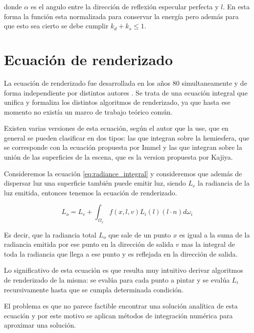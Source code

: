 donde $\alpha$ es el angulo entre la dirección de reflexión especular perfecta y $l$.
En esta forma la función esta normalizada para conservar la energía pero además para que esto sea cierto se debe cumplir $k_d + k_s \leq 1$.



\clearpage

\section{Ecuación de renderizado}

La ecuación de renderizado fue desarrollada en los años 80 simultaneamente y de forma independiente por distintos autores \cite{Kajiya1986, Immel1986}. Se trata de una ecuación integral que unifica y formaliza los distintos algoritmos de renderizado, ya que hasta ese momento no existía un marco de trabajo teórico común.

\medskip
Existen varias versiones de esta ecuación, según el autor que la use, que en general se pueden clasificar en dos tipos: las que integran sobre la hemiesfera, que se corresponde con la ecuación propuesta por Immel y las que integran sobre la unión de las superficies de la escena, que es la version propuesta por Kajiya.
\medskip

Consideremos la ecuación \ref{eq:radiance_integral}  y consideremos que además de dispersar luz una superficie también puede emitir luz, siendo $L_e$ la radiancia de la luz emitida, entonces tenemos la ecuación de renderizado.

\begin{equation}
L _ o = L_e + \int_{\Omega_x} f(x, l, v) L_i(l) (l \cdot n) d\omega_i 
\end{equation}

Es decir, que la radiancia total $L_o$ que sale de un punto $x$ es igual a la suma de la radiancia emitida por ese punto en la dirección de salida $v$ mas la integral de toda la radiancia que llega a ese punto y es reflejada en la dirección de salida.
\medskip

Lo significativo de esta ecuación es que resulta muy intuitivo derivar algoritmos de renderizado de la misma: se evalúa para cada punto a pintar y se evalúa $L_i$ recursivamente hasta que se cumpla determinada condición.
\medskip

El problema es que no parece factible encontrar una solución analítica de esta ecuación y por este motivo se aplican métodos de integración numérica para aproximar una solución.

